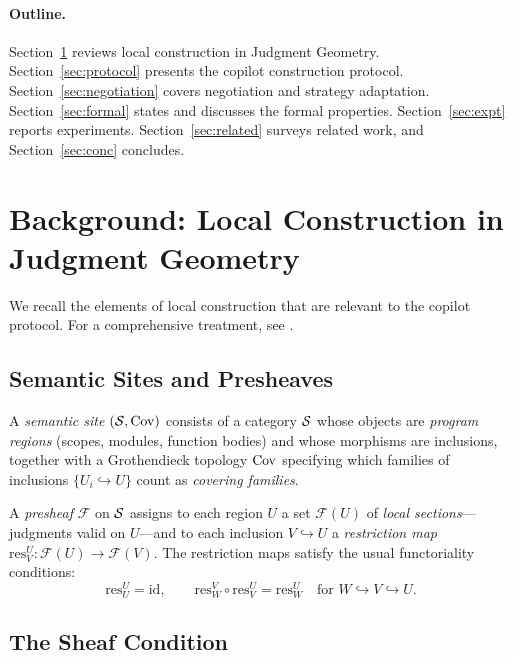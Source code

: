 \documentclass[11pt]{article}
\newcommand{\sheaf}{\mathcal{F}}
\newcommand{\restrict}{\mathrm{res}}
\begin{document}
\paragraph{Outline.}
Section~\ref{sec:background} reviews local construction in Judgment
Geometry.  Section~\ref{sec:protocol} presents the copilot
construction protocol.  Section~\ref{sec:negotiation} covers
negotiation and strategy adaptation.  Section~\ref{sec:formal}
states and discusses the formal properties.
Section~\ref{sec:expt} reports experiments.
Section~\ref{sec:related} surveys related work, and
Section~\ref{sec:conc} concludes.

\section{Background: Local Construction in Judgment
         Geometry}\label{sec:background}

We recall the elements of local construction that are relevant to the
copilot protocol.  For a comprehensive treatment, see
\cite{jugeo-foundations,jugeo-descent}.

\subsection{Semantic Sites and Presheaves}\label{sec:bg-sites}

A \emph{semantic site} $(\mathcal{S}, \mathrm{Cov})$ consists of a category $\mathcal{S}$
whose objects are \emph{program regions} (scopes, modules, function
bodies) and whose morphisms are inclusions, together with a Grothendieck
topology $\mathrm{Cov}$ specifying which families of inclusions
$\{U_i \hookrightarrow U\}$ count as \emph{covering families}.

A \emph{presheaf} $\sheaf$ on $\mathcal{S}$ assigns to each region $U$ a set
$\sheaf(U)$ of \emph{local sections}---judgments valid on $U$---and to
each inclusion $V \hookrightarrow U$ a \emph{restriction map}
$\restrict^U_V : \sheaf(U) \to \sheaf(V)$.  The restriction maps satisfy
the usual functoriality conditions:
\[
  \restrict^U_U = \mathrm{id}, \qquad
  \restrict^V_W \circ \restrict^U_V = \restrict^U_W
  \quad\text{for } W \hookrightarrow V \hookrightarrow U.
\]

\subsection{The Sheaf Condition}\label{sec:bg-sheaf}
\end{document}
